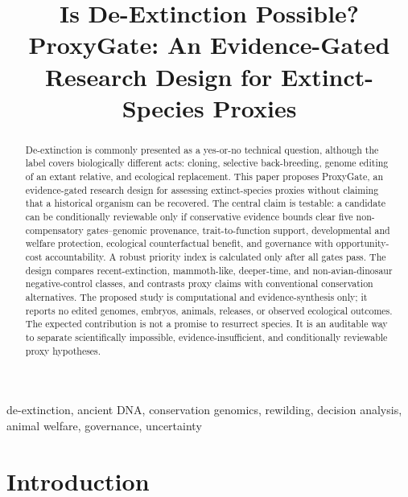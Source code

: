 \documentclass[conference]{IEEEtran}
\begin{document}
\title{Is De-Extinction Possible? ProxyGate: An Evidence-Gated Research Design for Extinct-Species Proxies}

\author{
}

\maketitle

\begin{abstract}
De-extinction is commonly presented as a yes-or-no technical question, although the label covers biologically different acts: cloning, selective back-breeding, genome editing of an extant relative, and ecological replacement. This paper proposes ProxyGate, an evidence-gated research design for assessing extinct-species proxies without claiming that a historical organism can be recovered. The central claim is testable: a candidate can be conditionally reviewable only if conservative evidence bounds clear five non-compensatory gates--genomic provenance, trait-to-function support, developmental and welfare protection, ecological counterfactual benefit, and governance with opportunity-cost accountability. A robust priority index is calculated only after all gates pass. The design compares recent-extinction, mammoth-like, deeper-time, and non-avian-dinosaur negative-control classes, and contrasts proxy claims with conventional conservation alternatives. The proposed study is computational and evidence-synthesis only; it reports no edited genomes, embryos, animals, releases, or observed ecological outcomes. The expected contribution is not a promise to resurrect species. It is an auditable way to separate scientifically impossible, evidence-insufficient, and conditionally reviewable proxy hypotheses.
\end{abstract}

\begin{IEEEkeywords}
de-extinction, ancient DNA, conservation genomics, rewilding, decision analysis, animal welfare, governance, uncertainty
\end{IEEEkeywords}

\section{Introduction}
\end{document}
